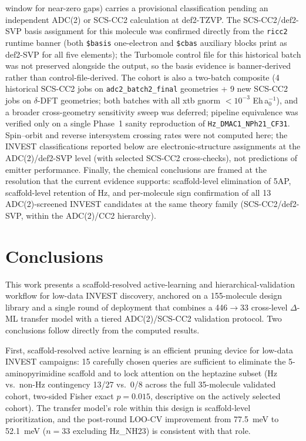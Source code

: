 \documentclass[journal=jcisd8,manuscript=article]{achemso}
\begin{document}
window for near-zero gaps) carries a provisional classification pending an independent ADC(2) or SCS-CC2 calculation at def2-TZVP. The SCS-CC2/def2-SVP basis assignment for this molecule was confirmed directly from the \texttt{ricc2} runtime banner (both \texttt{\$basis} one-electron and \texttt{\$cbas} auxiliary blocks print as def2-SVP for all five elements); the Turbomole control file for this historical batch was not preserved alongside the output, so the basis evidence is banner-derived rather than control-file-derived. The cohort is also a two-batch composite (4 historical SCS-CC2 jobs on \texttt{adc2\_batch2\_final} geometries + 9 new SCS-CC2 jobs on $\delta$-DFT geometries; both batches with all xtb gnorm $<\!10^{-3}$ Eh\,a$_0^{-1}$), and a broader cross-geometry sensitivity sweep was deferred; pipeline equivalence was verified only on a single Phase~1 sanity reproduction of \texttt{Hz\_DMAC1\_NPh21\_CF31}. Spin--orbit and reverse intersystem crossing rates were not computed here; the INVEST classifications reported below are electronic-structure assignments at the ADC(2)/def2-SVP level (with selected SCS-CC2 cross-checks), not predictions of emitter performance. Finally, the chemical conclusions are framed at the resolution that the current evidence supports: scaffold-level elimination of 5AP, scaffold-level retention of Hz, and per-molecule sign confirmation of all 13 ADC(2)-screened INVEST candidates at the same theory family (SCS-CC2/def2-SVP, within the ADC(2)/CC2 hierarchy).


\section{Conclusions}

This work presents a scaffold-resolved active-learning and hierarchical-validation workflow for low-data INVEST discovery, anchored on a 155-molecule design library and a single round of deployment that combines a 446$\rightarrow$33 cross-level $\Delta$-ML transfer model with a tiered ADC(2)/SCS-CC2 validation protocol. Two conclusions follow directly from the computed results.

First, scaffold-resolved active learning is an efficient pruning device for low-data INVEST campaigns: 15 carefully chosen queries are sufficient to eliminate the 5-aminopyrimidine scaffold and to lock attention on the heptazine subset (Hz vs.\ non-Hz contingency 13/27 vs.\ 0/8 across the full 35-molecule validated cohort, two-sided Fisher exact $p=0.015$, descriptive on the actively selected cohort). The transfer model's role within this design is scaffold-level prioritization, and the post-round LOO-CV improvement from \SI{77.5}{meV} to \SI{52.1}{meV} ($n=33$ excluding Hz\_NH23) is consistent with that role.
\end{document}
